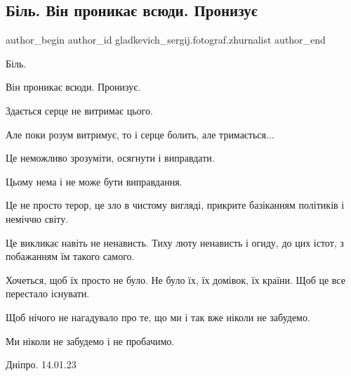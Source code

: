  
 
 
 
 

\subsection{Біль. Він проникає всюди. Пронизує}
\label{sec:15_01_2023.fb.gladkevich_sergij.fotograf.zhurnalist.1.b_l__v_n_pronika__vs}

\ifcmt
 author_begin
   author_id gladkevich_sergij.fotograf.zhurnalist
 author_end
\fi

Біль.

Він проникає всюди. Пронизує. 

Здається серце не витримає цього.

Але поки розум витримує, то і серце болить, але тримається...

Це неможливо зрозуміти, осягнути і виправдати.

Цьому нема і не може бути виправдання. 

Це не просто терор, це зло в чистому вигляді, прикрите базіканням політиків і
неміччю світу.

Це викликає навіть не ненависть. Тиху люту ненависть і огиду, до цих істот, з
побажанням їм такого самого.

Хочеться, щоб їх просто не було. Не було їх, їх домівок, їх країни. Щоб це все
перестало існувати. 

Щоб нічого не нагадувало про те, що ми і так  вже ніколи не забудемо. 

Ми ніколи не забудемо  і не пробачимо.

Дніпро. 14.01.23
